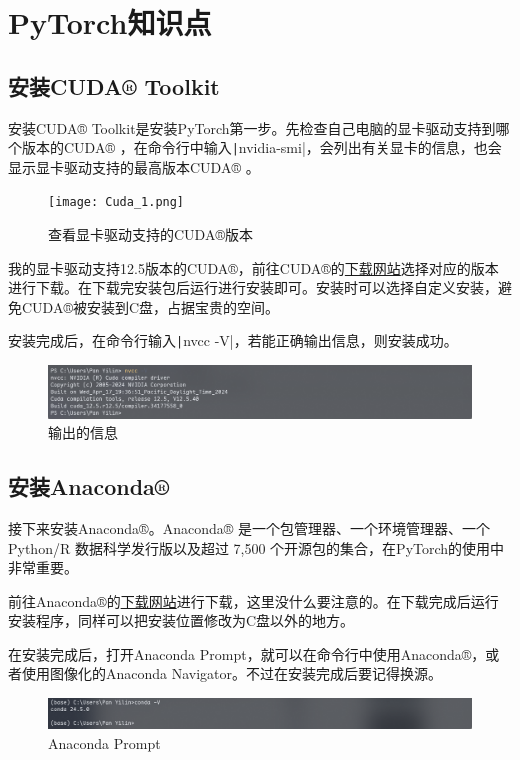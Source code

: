 \documentclass[fontset=ubuntu]{ctexart}
\begin{document}
\section{PyTorch知识点}
\subsection{安装CUDA® Toolkit}
安装CUDA® Toolkit是安装PyTorch第一步。先检查自己电脑的显卡驱动支持到哪个版本的CUDA® ，在命令行中输入\texttt|nvidia-smi|，会列出有关显卡的信息，也会显示显卡驱动支持的最高版本CUDA® 。
\begin{figure}[htb]
    \centering
    \texttt{[image: Cuda\_1.png]}
    \caption{查看显卡驱动支持的CUDA®版本}
    \label{fig:Cuda_1}
\end{figure}

我的显卡驱动支持12.5版本的CUDA®，前往CUDA®的\href{https://developer.nvidia.com/cuda-toolkit-archive}{下载网站}选择对应的版本进行下载。在下载完安装包后运行进行安装即可。安装时可以选择自定义安装，避免CUDA®被安装到C盘，占据宝贵的空间。

安装完成后，在命令行输入\texttt|nvcc -V|，若能正确输出信息，则安装成功。
\begin{figure}[htb]
    \centering
    \includegraphics[width=0.75\linewidth]{Cuda_2.png}
    \caption{输出的信息}
    \label{fig:Cuda_2}
\end{figure}

\subsection{安装Anaconda®}
接下来安装Anaconda®。Anaconda® 是一个包管理器、一个环境管理器、一个 Python/R 数据科学发行版以及超过 7,500 个开源包的集合，在PyTorch的使用中非常重要。

前往Anaconda®的\href{https://www.anaconda.com/download/success}{下载网站}进行下载，这里没什么要注意的。在下载完成后运行安装程序，同样可以把安装位置修改为C盘以外的地方。

在安装完成后，打开Anaconda Prompt，就可以在命令行中使用Anaconda®，或者使用图像化的Anaconda Navigator。不过在安装完成后要记得换源。
\begin{figure}[htb]
    \centering
    \includegraphics[width=0.75\linewidth]{conda_1.png}
    \caption{Anaconda Prompt}
    \label{fig:conda_1}
\end{figure}
\end{document}
